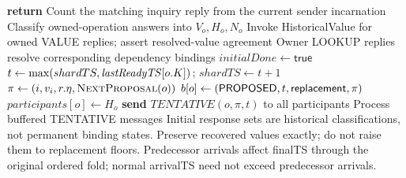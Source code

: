 \begin{algorithm}[p]
\caption{Initial collection and candidate selection}
\begin{algorithmic}[1]
    \State \textbf{return}
  \EndIf
  \State Count the matching inquiry reply from the current sender incarnation
  \State Classify owned-operation answers into $V_o,H_o,N_o$
  \State Invoke HistoricalValue for owned VALUE replies; assert resolved-value agreement
  \State Owner LOOKUP replies resolve corresponding dependency bindings
    \State $initialDone\gets\mathsf{true}$
        \State {}
      \Else
        \State $t\gets\max(shardTS,\mathit{lastReadyTS}[o.K])$; $shardTS\gets t+1$
        \State $\pi\gets(i,v_i,r.\eta,\Call{NextProposal}{o})$
        \State $b[o]\gets(\mathsf{PROPOSED},t,\mathsf{replacement},\pi)$
        \State $participants[o]\gets H_o$
        \State \textbf{send} $TENTATIVE(o,\pi,t)$ to all participants
        \State {}
      \EndIf
    \EndFor
    \State Process buffered TENTATIVE messages
  \EndIf
\EndProcedure
\Statex Initial response sets are historical classifications, not permanent binding states.
\Statex Preserve recovered values exactly; do not raise them to replacement floors.
\Statex Predecessor arrivals affect finalTS through the original ordered fold;
\Statex normal arrivalTS need not exceed predecessor arrivals.
\end{algorithmic}
\end{algorithm}

